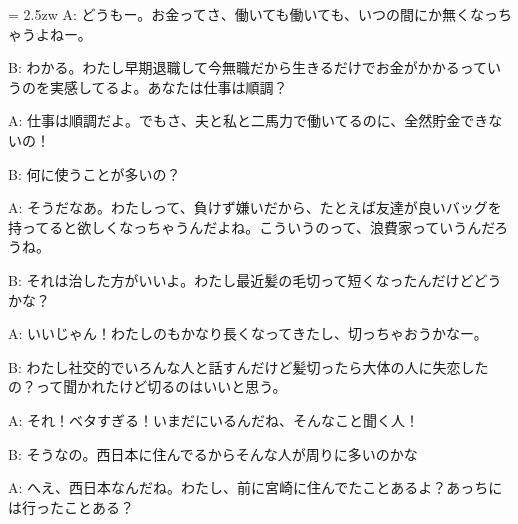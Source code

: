 \documentclass[11pt]{amsart}
\title{}
\author{}
\newenvironment{hangall}[1]{\hangindent = 2.5zw\everypar{\hangindent = 2.5zw}}{}
\begin{document}
\maketitle
\begin{hangall}{}%
A: どうもー。お金ってさ、働いても働いても、いつの間にか無くなっちゃうよねー。

B: わかる。わたし早期退職して今無職だから生きるだけでお金がかかるっていうのを実感してるよ。あなたは仕事は順調？

A: 仕事は順調だよ。でもさ、夫と私と二馬力で働いてるのに、全然貯金できないの！

B: 何に使うことが多いの？

A: そうだなあ。わたしって、負けず嫌いだから、たとえば友達が良いバッグを持ってると欲しくなっちゃうんだよね。こういうのって、浪費家っていうんだろうね。

B: それは治した方がいいよ。わたし最近髪の毛切って短くなったんだけどどうかな？

A: いいじゃん！わたしのもかなり長くなってきたし、切っちゃおうかなー。

B: わたし社交的でいろんな人と話すんだけど髪切ったら大体の人に失恋したの？って聞かれたけど切るのはいいと思う。

A: それ！ベタすぎる！いまだにいるんだね、そんなこと聞く人！

B: そうなの。西日本に住んでるからそんな人が周りに多いのかな

A: へえ、西日本なんだね。わたし、前に宮崎に住んでたことあるよ？あっちには行ったことある？
\end{hangall}
\end{document}
